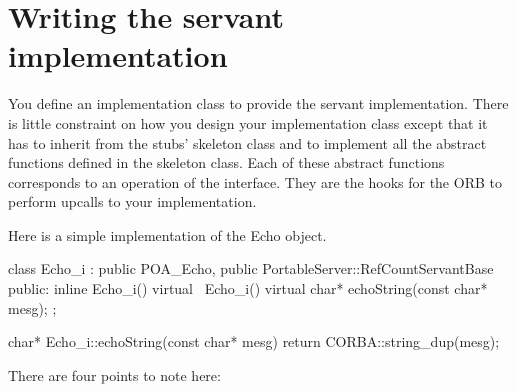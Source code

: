 \documentclass[11pt,twoside,a4paper]{book}
\begin{document}
\section{Writing the servant implementation}
\label{objimpl}

You define an implementation class to provide the servant
implementation. There is little constraint on how you design your
implementation class except that it has to inherit from the stubs'
skeleton class and to implement all the abstract functions defined in
the skeleton class. Each of these abstract functions corresponds to an
operation of the interface. They are the hooks for the ORB to perform
upcalls to your implementation.

Here is a simple implementation of the Echo object.

\begin{cxxlisting}
class Echo_i : public POA_Echo,
	       public PortableServer::RefCountServantBase
{
public:
  inline Echo_i() {}
  virtual ~Echo_i() {}
  virtual char* echoString(const char* mesg);
};

char* Echo_i::echoString(const char* mesg)
{
  return CORBA::string_dup(mesg);
}
\end{cxxlisting}

There are four points to note here:
\end{document}
